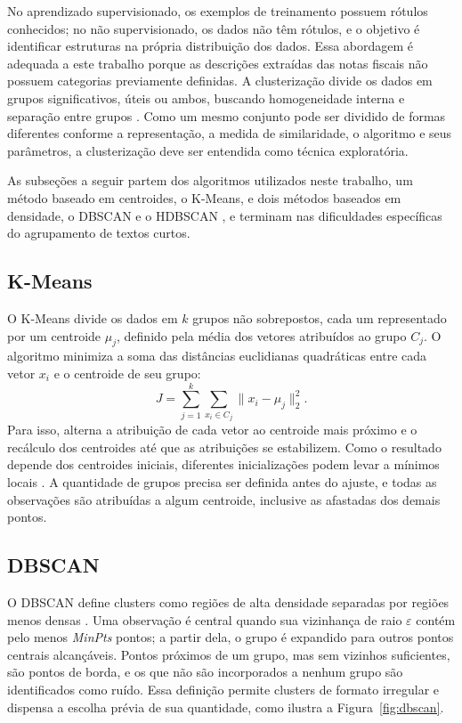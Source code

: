 \documentclass[english,brazilian]{UNISINOSmonografia}
\begin{document}
No aprendizado supervisionado, os exemplos de treinamento possuem rótulos conhecidos; no não supervisionado, os dados não têm rótulos, e o objetivo é identificar estruturas na própria distribuição dos dados. Essa abordagem é adequada a este trabalho porque as descrições extraídas das notas fiscais não possuem categorias previamente definidas. A clusterização divide os dados em grupos significativos, úteis ou ambos, buscando homogeneidade interna e separação entre grupos \cite{tan2005introduction}. Como um mesmo conjunto pode ser dividido de formas diferentes conforme a representação, a medida de similaridade, o algoritmo e seus parâmetros, a clusterização deve ser entendida como técnica exploratória.

As subseções a seguir partem dos algoritmos utilizados neste trabalho, um método baseado em centroides, o K-Means, e dois métodos baseados em densidade, o DBSCAN e o HDBSCAN \cite{tan2005introduction}, e terminam nas dificuldades específicas do agrupamento de textos curtos.

\subsection{K-Means}

O K-Means divide os dados em $k$ grupos não sobrepostos, cada um representado por um centroide $\mu_j$, definido pela média dos vetores atribuídos ao grupo $C_j$. O algoritmo minimiza a soma das distâncias euclidianas quadráticas entre cada vetor $x_i$ e o centroide de seu grupo:
\begin{equation}
J=\sum_{j=1}^{k}\sum_{x_i\in C_j}\lVert x_i-\mu_j\rVert_2^2.
\label{eq:kmeans}
\end{equation}
Para isso, alterna a atribuição de cada vetor ao centroide mais próximo e o recálculo dos centroides até que as atribuições se estabilizem. Como o resultado depende dos centroides iniciais, diferentes inicializações podem levar a mínimos locais \cite{tan2005introduction}. A quantidade de grupos precisa ser definida antes do ajuste, e todas as observações são atribuídas a algum centroide, inclusive as afastadas dos demais pontos.

\subsection{DBSCAN}

O DBSCAN define clusters como regiões de alta densidade separadas por regiões menos densas \cite{ester1996dbscan}. Uma observação é central quando sua vizinhança de raio $\varepsilon$ contém pelo menos \textit{MinPts} pontos; a partir dela, o grupo é expandido para outros pontos centrais alcançáveis. Pontos próximos de um grupo, mas sem vizinhos suficientes, são pontos de borda, e os que não são incorporados a nenhum grupo são identificados como ruído. Essa definição permite clusters de formato irregular e dispensa a escolha prévia de sua quantidade, como ilustra a Figura~\ref{fig:dbscan}.
\end{document}
